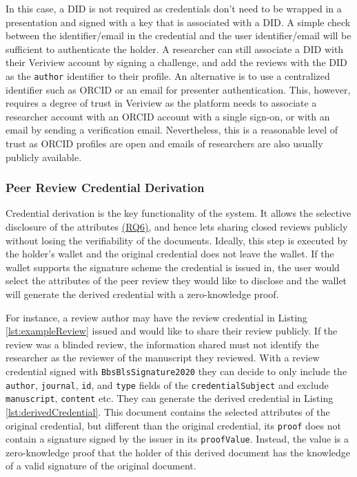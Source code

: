 In this case, a \acrshort{DID} is not required as credentials don't need to be wrapped in a presentation and signed with a key that is associated with a \acrshort{DID}. A simple check between the identifier/email in the credential and the user identifier/email will be sufficient to authenticate the holder. A researcher can still associate a \acrshort{DID} with their Veriview account by signing a challenge, and add the reviews with the \acrshort{DID} as the \lstinline{author} identifier to their profile. An alternative is to use a centralized identifier such as \acrshort{ORCID} or an email for presenter authentication. This, however, requires a degree of trust in Veriview as the platform needs to associate a researcher account with an \acrshort{ORCID} account with a single sign-on, or with an email by sending a verification email. Nevertheless, this is a reasonable level of trust as \acrshort{ORCID} profiles are open and emails of researchers are also usually publicly available.

\subsubsection{Peer Review Credential Derivation}

Credential derivation is the key functionality of the system. It allows the selective disclosure of the attributes \hyperref[rq:selective-disclosure]{(RQ6)}, and hence lets sharing closed reviews publicly without losing the verifiability of the documents. Ideally, this step is executed by the holder's wallet and the original credential does not leave the wallet. If the wallet supports the signature scheme the credential is issued in, the user would select the attributes of the peer review they would like to disclose and the wallet will generate the derived credential with a zero-knowledge proof.

For instance, a review author may have the review credential in Listing \ref{lst:exampleReview} issued and would like to share their review publicly. If the review was a blinded review, the information shared must not identify the researcher as the reviewer of the manuscript they reviewed. With a review credential signed with \lstinline{BbsBlsSignature2020} they can decide to only include the \lstinline{author}, \lstinline{journal}, \lstinline{id}, and \lstinline{type} fields of the \lstinline{credentialSubject} and exclude \lstinline{manuscript}, \lstinline{content} etc. They can generate the derived credential in Listing \ref{lst:derivedCredential}. This document contains the selected attributes of the original credential, but different than the original credential, its \lstinline{proof} does not contain a signature signed by the issuer in its \lstinline{proofValue}. Instead, the value is a zero-knowledge proof that the holder of this derived document has the knowledge of a valid signature of the original document.

